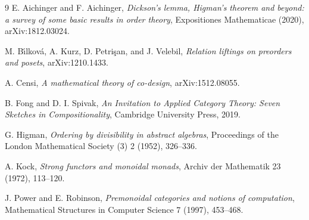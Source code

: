 \documentclass[11pt,a4paper]{article}
\theoremstyle{plain}
\theoremstyle{definition}
\theoremstyle{remark}
\begin{document}
\begin{thebibliography}{9}
    E. Aichinger and F. Aichinger,
    \emph{Dickson's lemma, Higman's theorem and beyond: a survey of some basic results in order theory},
    Expositiones Mathematicae (2020), arXiv:1812.03024.

    M. B\'{\i}lkov\'a, A. Kurz, D. Petri\c{s}an, and J. Velebil,
    \emph{Relation liftings on preorders and posets},
    arXiv:1210.1433.

    A. Censi,
    \emph{A mathematical theory of co-design},
    arXiv:1512.08055.

    B. Fong and D. I. Spivak,
    \emph{An Invitation to Applied Category Theory: Seven Sketches in Compositionality},
    Cambridge University Press, 2019.

    G. Higman,
    \emph{Ordering by divisibility in abstract algebras},
    Proceedings of the London Mathematical Society (3) 2 (1952), 326--336.

    A. Kock,
    \emph{Strong functors and monoidal monads},
    Archiv der Mathematik 23 (1972), 113--120.

    J. Power and E. Robinson,
    \emph{Premonoidal categories and notions of computation},
    Mathematical Structures in Computer Science 7 (1997), 453--468.
\end{thebibliography}
\end{document}
